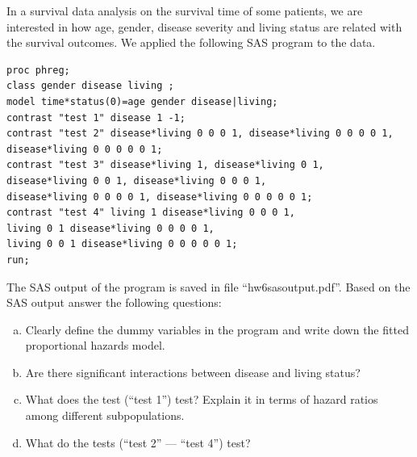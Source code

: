 \documentclass{elegantbook}
\begin{document}
\begin{exercise*}[1]
    In a survival data analysis on the survival time of some patients, we are interested in how age, gender, disease severity and living status are related with the survival outcomes. We applied the following SAS program to the data.
    \begin{verbatim}
proc phreg;
class gender disease living ;
model time*status(0)=age gender disease|living;
contrast "test 1" disease 1 -1;
contrast "test 2" disease*living 0 0 0 1, disease*living 0 0 0 0 1,
disease*living 0 0 0 0 0 1;
contrast "test 3" disease*living 1, disease*living 0 1,
disease*living 0 0 1, disease*living 0 0 0 1,
disease*living 0 0 0 0 1, disease*living 0 0 0 0 0 1;
contrast "test 4" living 1 disease*living 0 0 0 1,
living 0 1 disease*living 0 0 0 0 1,
living 0 0 1 disease*living 0 0 0 0 0 1;
run;
    \end{verbatim}
    The SAS output of the program is saved in file “hw6sasoutput.pdf”. Based on the SAS output answer the following questions:

    \begin{enumerate}[a)]
        \item Clearly define the dummy variables in the program and write down the fitted proportional hazards model. 
        \item Are there significant interactions between disease and living status? 
        \item What does the test (“test 1”) test? Explain it in terms of hazard ratios among different subpopulations. 
        \item What do the tests (“test 2” --- “test 4”) test? 
    \end{enumerate}
\end{exercise*}
\end{document}
